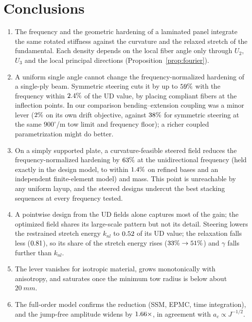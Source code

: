 \section{Conclusions}\label{sec:conclusions}
\begin{enumerate}[itemsep=2pt]
\item The frequency and the geometric hardening of a laminated panel integrate the same
  rotated stiffness against the curvature and the relaxed stretch of the fundamental.
  Each density depends on the local fiber angle only through $U_2$, $U_3$ and the local
  principal directions (Proposition~\ref{prop:fourier}).
\item A uniform single angle cannot change the frequency-normalized hardening of a
  single-ply beam. Symmetric steering cuts it by up to $59\%$ with the
  frequency within $2.4\%$ of the UD value, by placing compliant fibers at the inflection points. In our comparison
  bending--extension coupling was a minor lever ($2\%$ on its own drift objective,
  against $38\%$ for symmetric steering at the same $900^\circ$/m tow limit and
  frequency floor); a richer coupled parametrization might do better.
\item On a simply supported plate, a curvature-feasible steered field reduces the
  frequency-normalized hardening by $63\%$ at the unidirectional frequency
  (held exactly in the design model, to within $1.4\%$ on refined bases and an independent finite-element model) and mass. This point is unreachable by any uniform layup, and the steered
  designs undercut the best stacking sequences at every frequency tested.
\item A pointwise design from the UD fields alone captures most of the gain; the
  optimized field shares its large-scale pattern but not its detail. Steering lowers the restrained stretch energy $k_{nl}$ to $0.52$ of its UD
  value; the relaxation falls less ($0.81$), so its share of the stretch energy rises
  ($33\%\to51\%$) and $\gamma$ falls further than $k_{nl}$.
\item The lever vanishes for isotropic material, grows monotonically with anisotropy, and
  saturates once the minimum tow radius is below about $\SI{20}{mm}$.
\item The full-order model confirms the reduction (SSM, EPMC, time integration), and the
  jump-free amplitude widens by $1.66\times$, in agreement with
  $a_c\propto J^{-1/2}$.
\end{enumerate}

